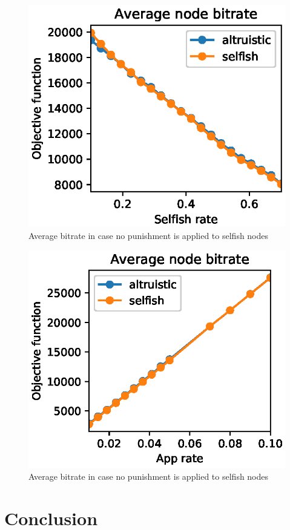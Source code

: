 \documentclass[conference]{IEEEtran}
\begin{document}
\begin{figure}
  \includegraphics{figures/obj_func_vs_selfish_rate_no_punish.eps}
  \caption{Average bitrate in case no punishment is applied to selfish nodes}
  \label{fig:no-blame}
\end{figure}

\begin{figure}
  \includegraphics{figures/obj_func_vs_app_rate_no_punish.eps}
  \caption{Average bitrate in case no punishment is applied to selfish nodes}
  \label{fig:no-blame-app-rate}
\end{figure}


\section{Conclusion}


% 
\end{document}
